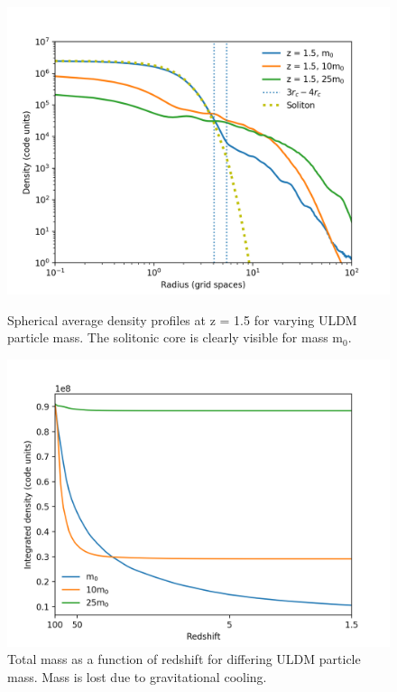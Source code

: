 \documentclass[a4paper,11pt]{article}
\begin{document}
\begin{figure}[!htb]
  \includegraphics[trim={1.5cm 0 1cm 0},scale=0.55]{final_profile_comparison.png}
  \caption{Spherical average density profiles at z = 1.5 for varying ULDM particle mass. The solitonic core is clearly visible for mass $\mathrm{m}_0$.}\label{fig:final_prof}
\endminipage\hfill
{}
  \includegraphics[trim={1.6cm 0 0 0.8cm},scale=0.55]{mass_loss_comparison.png}
  \caption{Total mass as a function of redshift for differing ULDM particle mass. Mass is lost due to gravitational cooling.}\label{fig:grav_cool}
\endminipage\hfill
\end{figure}
\end{document}
